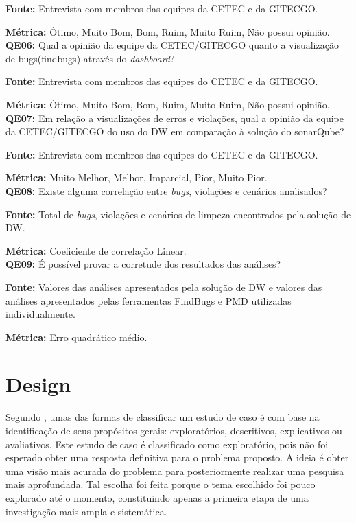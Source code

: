 \textbf{Fonte:} Entrevista com membros das equipes da CETEC e da GITECGO.

\textbf{Métrica:} Ótimo, Muito Bom, Bom, Ruim, Muito Ruim, Não possui opinião.\\



\textbf{QE06: } Qual a opinião da equipe da CETEC/GITECGO quanto a visualização de bugs(findbugs) através do \textit{dashboard}?

\textbf{Fonte:} Entrevista com membros das equipes do CETEC e da GITECGO.

\textbf{Métrica:} Ótimo, Muito Bom, Bom, Ruim, Muito Ruim, Não possui opinião.\\



\textbf{QE07: } Em relação a visualizações de erros e violações, qual a opinião da equipe da CETEC/GITECGO do uso do DW em comparação à solução do sonarQube?

\textbf{Fonte:} Entrevista com membros das equipes do CETEC e da GITECGO.

\textbf{Métrica:} Muito Melhor, Melhor, Imparcial, Pior, Muito Pior.\\



\textbf{QE08: } Existe alguma correlação entre \textit{bugs}, violações e cenários analisados? 

\textbf{Fonte:} Total de \textit{bugs}, violações e cenários de limpeza encontrados pela solução de DW.

\textbf{Métrica:} Coeficiente de correlação Linear.\\



\textbf{QE09: } É possível provar a corretude dos resultados das análises? 

\textbf{Fonte:} Valores das análises apresentados pela solução de DW e valores das análises apresentados pelas ferramentas FindBugs e PMD utilizadas individualmente.
 
\textbf{Métrica:} Erro quadrático médio.\\


\section{Design}
\label{sec:design} 

Segundo \cite{wohlin2012experimentation}, umas das formas de classificar um estudo de caso é com base na identificação de
seus propósitos gerais: exploratórios, descritivos, explicativos ou avaliativos. Este estudo de
caso é classificado como exploratório, pois não foi esperado obter uma resposta definitiva para o problema proposto. A ideia é obter uma visão mais acurada do problema para posteriormente realizar uma pesquisa mais aprofundada. Tal escolha foi feita porque o tema escolhido foi pouco explorado até o momento, constituindo apenas a primeira etapa de uma investigação mais ampla e sistemática.

